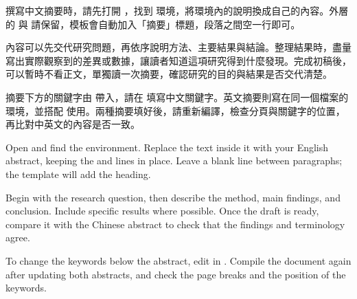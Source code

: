\begin{abstractzh}
撰寫中文摘要時，請先打開 ，找到  環境，將環境內的說明換成自己的內容。外層的 \code{\begin} 與 \code{\end} 請保留，模板會自動加入「摘要」標題，段落之間空一行即可。

內容可以先交代研究問題，再依序說明方法、主要結果與結論。整理結果時，盡量寫出實際觀察到的差異或數據，讓讀者知道這項研究得到什麼發現。完成初稿後，可以暫時不看正文，單獨讀一次摘要，確認研究的目的與結果是否交代清楚。

摘要下方的關鍵字由  帶入，請在  填寫中文關鍵字。英文摘要則寫在同一個檔案的  環境，並搭配  使用。兩種摘要填好後，請重新編譯，檢查分頁與關鍵字的位置，再比對中英文的內容是否一致。
\end{abstractzh}

\begin{abstracten}
Open  and find the  environment. Replace the text inside it with your English abstract, keeping the \code{\begin} and \code{\end} lines in place. Leave a blank line between paragraphs; the template will add the heading.

Begin with the research question, then describe the method, main findings, and conclusion. Include specific results where possible. Once the draft is ready, compare it with the Chinese abstract to check that the findings and terminology agree.

To change the keywords below the abstract, edit  in . Compile the document again after updating both abstracts, and check the page breaks and the position of the keywords.
\end{abstracten}
